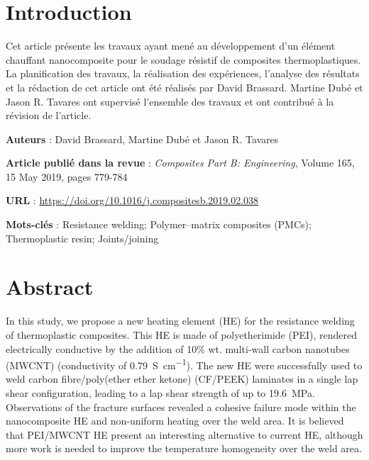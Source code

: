 \label{sec:Theme1}


\section{Introduction}

Cet article présente les travaux ayant mené au développement d'un élément chauffant nanocomposite pour le soudage résistif de composites thermoplastiques. La planification des travaux, la réalisation des expériences, l'analyse des résultats et la rédaction de cet article ont été réalisés par David Brassard. Martine Dubé et Jason R. Tavares ont supervisé l'ensemble des travaux et ont contribué à la révision de l'article. 

\textbf{Auteurs} : David Brassard, Martine Dubé et Jason R. Tavares

\textbf{Article publié dans la revue} : \textit{Composites Part B: Engineering}, Volume 165, 15 May 2019, pages 779-784

\textbf{URL} : \url{https://doi.org/10.1016/j.compositesb.2019.02.038}

\textbf{Mots-clés} : Resistance welding; Polymer–matrix composites (PMCs); Thermoplastic resin; Joints/joining


\section{Abstract}

In this study, we propose a new heating element (HE) for the resistance welding of thermoplastic composites. 
This HE is made of polyetherimide (PEI), rendered electrically conductive by the addition of 10\% wt. multi-wall carbon nanotubes (MWCNT) (conductivity of \SI{0.79}{\siemens\per\cm}).
The new HE were successfully used to weld carbon fibre/poly(ether ether ketone) (CF/PEEK) laminates in a single lap shear configuration, leading to a lap shear strength of up to \SI{19.6}{\mega\pascal}.
Observations of the fracture surfaces revealed a cohesive failure mode within the nanocomposite HE and non-uniform heating over the weld area. 
It is believed that PEI/MWCNT HE present an interesting alternative to current HE, although more work is needed to improve the temperature homogeneity over the weld area.
	
